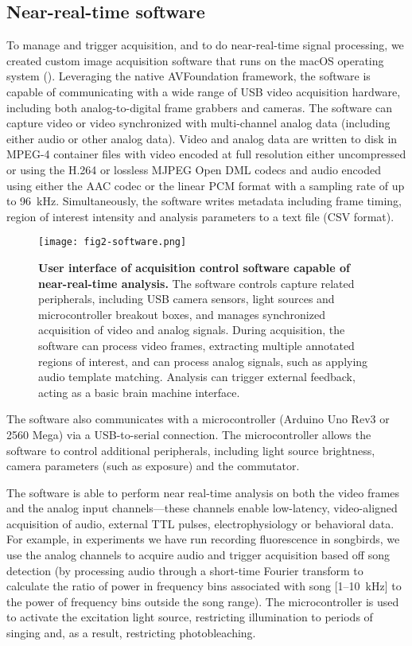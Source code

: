 
\subsection{Near-real-time software}

To manage and trigger acquisition, and to do near-real-time signal
processing, we created custom image acquisition software that runs
on the macOS operating system (). Leveraging the 
native AVFoundation
framework, the software is capable of communicating with a wide 
range of USB video 
acquisition hardware, including both analog-to-digital frame 
grabbers and cameras. The software can capture video or video 
synchronized with multi-channel analog data (including 
either audio or other analog data). Video and analog data are 
written to disk in MPEG-4 container files with video encoded at 
full resolution either uncompressed or using the H.264 or lossless 
MJPEG Open DML codecs and audio encoded using either the AAC codec 
or the linear PCM format with a sampling rate of up to 
96~\si{\kilo\hertz}. Simultaneously, the software writes metadata 
including frame timing, region of interest intensity and analysis  
parameters to a text file (CSV format).

\begin{figure}
\texttt{[image: fig2-software.png]}
\caption[Software for capture near-real-time analysis]{\textbf{User interface of acquisition
control software capable of near-real-time analysis.} The software 
controls capture related peripherals, including USB camera sensors,
light sources and microcontroller breakout boxes, and manages 
synchronized acquisition of video and analog signals. During 
acquisition, the software can process video frames, extracting 
multiple annotated regions of interest, and can process analog 
signals, such as applying audio template matching. Analysis 
can trigger external feedback, acting as a basic brain machine 
interface.}
\label{fig:software}
\end{figure}

The software also communicates with a microcontroller 
(Arduino Uno Rev3 or 2560 Mega) via a USB-to-serial connection. The 
microcontroller allows the software to control additional 
peripherals, including light source brightness, camera parameters 
(such as exposure) and the commutator.

The software is able to perform near real-time analysis on both the 
video frames and the analog input channels---these channels enable
low-latency, video-aligned acquisition of audio, external TTL 
pulses, electrophysiology or behavioral data. 
For example, in experiments we have run recording fluorescence in songbirds, 
we use the analog channels to acquire audio and trigger acquisition 
based off song detection (by processing audio through a short-time
Fourier transform to calculate the ratio of power in frequency 
bins associated with song [1--10~kHz] to the power of frequency bins outside 
the song range). The microcontroller is used to activate 
the excitation light source, restricting illumination to periods of 
singing and, as a result, restricting photobleaching. 

